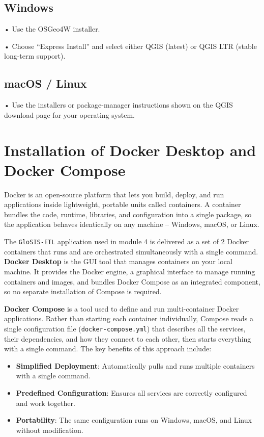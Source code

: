 \documentclass[
  10pt,
  b5paper,
  oneside]{book}
\providecommand{\tightlist}{%
  \setlength{\itemsep}{0pt}\setlength{\parskip}{0pt}}
\begin{document}
\subsection{Windows}\label{windows}

• Use the OSGeo4W installer.

• Choose ``Express Install'' and select either QGIS (latest) or QGIS LTR (stable long-term support).

\subsection{macOS / Linux}\label{macos-linux}

• Use the installers or package-manager instructions shown on the QGIS download page for your operating system.

\section*{Installation of Docker Desktop and Docker Compose}\label{installation-of-docker-desktop-and-docker-compose}

Docker is an open-source platform that lets you build, deploy, and run applications inside lightweight, portable units called containers. A container bundles the code, runtime, libraries, and configuration into a single package, so the application behaves identically on any machine -- Windows, macOS, or Linux.

The \texttt{GloSIS-ETL} application used in module 4 is delivered as a set of 2 Docker containers that runs and are orchestrated simultaneously with a single command. \textbf{Docker Desktop} is the GUI tool that manages containers on your local machine. It provides the Docker engine, a graphical interface to manage running containers and images, and bundles Docker Compose as an integrated component, so no separate installation of Compose is required.

\textbf{Docker Compose} is a tool used to define and run multi-container Docker applications. Rather than starting each container individually, Compose reads a single configuration file (\texttt{docker-compose.yml}) that describes all the services, their dependencies, and how they connect to each other, then starts everything with a single command. The key benefits of this approach include:

\begin{itemize}
\tightlist
\item
  \textbf{Simplified Deployment}: Automatically pulls and runs multiple containers with a single command.
\item
  \textbf{Predefined Configuration}: Ensures all services are correctly configured and work together.
\item
  \textbf{Portability}: The same configuration runs on Windows, macOS, and Linux without modification.
\end{itemize}
\end{document}
